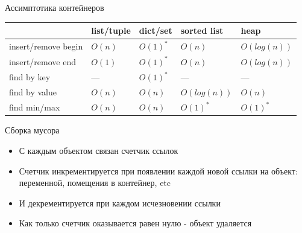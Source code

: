 \documentclass{article}
\begin{document}
\begin{center} Ассимптотика контейнеров \end{center}
\begin{center}
\begin{tabular}{ | l | l | l | l | l | }
	\hline
       & \cellcolor[gray]{0.8} list/tuple & \cellcolor[gray]{0.8} dict/set &  \cellcolor[gray]{0.8} sorted list & \cellcolor[gray]{0.8} heap \\
  	\hline
  insert/remove begin     & \cellcolor{pink} $O(n)$ & \cellcolor{green} $O(1)^*$ & \cellcolor{pink} $O(n)$ & \cellcolor{Aquamarine} $O(log(n))$ \\
  	\hline
  insert/remove end       & \cellcolor{green} $O(1)$ & \cellcolor{green} $O(1)^*$ & \cellcolor{pink} $O(n)$ & \cellcolor{Aquamarine} $O(log(n))$  \\
  	\hline
  find by key      &  --- & \cellcolor{green} $O(1)^*$ & --- & --- \\
  	\hline
  find by value     &  \cellcolor{pink} $O(n)$ & \cellcolor{pink} $O(n)$ & \cellcolor{Aquamarine} $O(log(n))$ & \cellcolor{pink} $O(n)$ \\
  	\hline
  find min/max     &  \cellcolor{pink} $O(n)$ & \cellcolor{pink} $O(n)$ & \cellcolor{green} $O(1)^*$ & \cellcolor{green} $O(1)^*$ \\
  	\hline

\end{tabular}
\end{center}
\newpage

\begin{center} Сборка мусора \end{center}
\begin{itemize}
	\item С каждым объектом связан счетчик ссылок
	\item Счетчик инкрементируется при появлении каждой новой ссылки на объект:
	       переменной, помещения в контейнер, etc
	\item И декрементируется при каждом исчезновении ссылки
	\item Как только счетчик оказывается равен нулю - объект удаляется
\end{itemize}
\newpage
\end{document}

